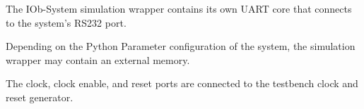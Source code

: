 %

The IOb-System simulation wrapper contains its own UART core that connects to the system's RS232 port.

Depending on the Python Parameter configuration of the system, the simulation wrapper may contain an external memory.

The clock, clock enable, and reset ports are connected to the testbench clock and reset generator.

